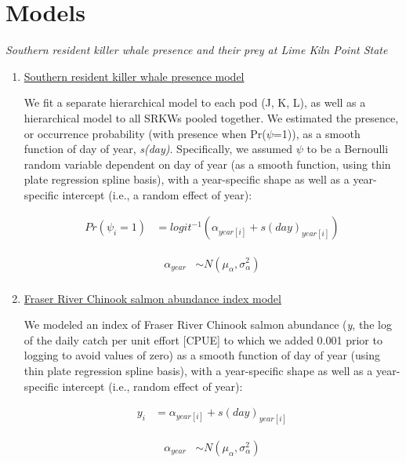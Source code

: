 \documentclass{article}
\begin{document}
\section*{Models}
\emph{Southern resident killer whale presence and their prey at Lime Kiln Point State}
\begin{enumerate}
\item \underline{Southern resident killer whale presence model}
\par We fit a separate hierarchical model to each pod (J, K, L), as well as a hierarchical model to all SRKWs pooled together. We estimated the presence, or occurrence probability (with presence when Pr(\emph{$\psi$}=1)), as a smooth function of day of year, \emph{s(day)}. Specifically, we assumed $\psi$ to be a Bernoulli random variable dependent on day of year (as a smooth function, using thin plate regression spline basis), with a year-specific shape as well as a year-specific intercept (i.e., a random effect of year):


\begin{align*}
Pr(\psi_i = 1) &= logit^{-1} (\alpha_{year[i]} + s(day)_{year[i]})
\end{align*}

\begin{align*}
\alpha_{year} & \sim N(\mu_{\alpha}, \sigma^{2}_{\alpha}) \\
\end{align*}


\item \underline{Fraser River Chinook salmon abundance index model}

We modeled an index of Fraser River Chinook salmon abundance (\emph{y}, the log of the daily catch per unit effort [CPUE] to which we added 0.001 prior to logging to avoid values of zero) as a smooth function of day of year (using thin plate regression spline basis), with a year-specific shape as well as a year-specific intercept (i.e., random effect of year):


\begin{align*}
y_i &= \alpha_{year[i]} + s(day)_{year[i]}
\end{align*}

\begin{align*}
\alpha_{year} & \sim N(\mu_{\alpha}, \sigma^{2}_{\alpha}) \\
\end{align*}

\end{enumerate}
\end{document}
